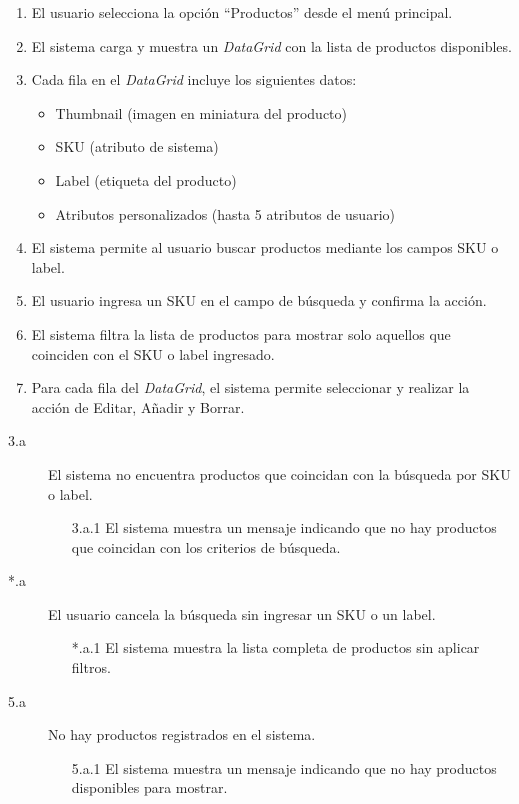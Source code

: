 \begin{enumerate}
    \item El usuario selecciona la opción \enquote{Productos} desde el menú principal.
    \item El sistema carga y muestra un \textit{DataGrid} con la lista de productos disponibles.
    \item Cada fila en el \textit{DataGrid} incluye los siguientes datos:
    \begin{itemize}
        \item Thumbnail (imagen en miniatura del producto)
        \item SKU (atributo de sistema)
        \item Label (etiqueta del producto)
        \item Atributos personalizados (hasta 5 atributos de usuario)
    \end{itemize}
    \item El sistema permite al usuario buscar productos mediante los campos SKU o label.
    \item El usuario ingresa un SKU en el campo de búsqueda y confirma la acción.
    \item El sistema filtra la lista de productos para mostrar solo aquellos que coinciden con el SKU o label ingresado.
    \item Para cada fila del \textit{DataGrid}, el sistema permite seleccionar y realizar la acción de Editar, Añadir y Borrar.
\end{enumerate}

\begin{description}
    \item[3.a] El sistema no encuentra productos que coincidan con la búsqueda por SKU o label.
    \begin{enumerate}
        \item[3.a.1] El sistema muestra un mensaje indicando que no hay productos que coincidan con los criterios de búsqueda.
    \end{enumerate}

    \item[*.a] El usuario cancela la búsqueda sin ingresar un SKU o un label.
    \begin{enumerate}
        \item[*.a.1] El sistema muestra la lista completa de productos sin aplicar filtros.
    \end{enumerate}

    \item[5.a] No hay productos registrados en el sistema.
    \begin{enumerate}
        \item[5.a.1] El sistema muestra un mensaje indicando que no hay productos disponibles para mostrar.
    \end{enumerate}
\end{description}

